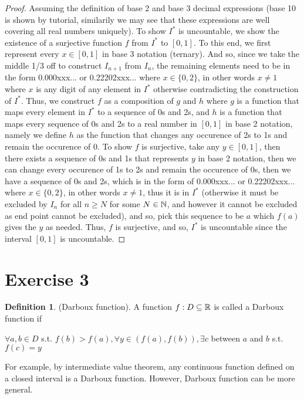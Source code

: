 \documentclass{homework}
\newcommand{\R}{\bb{R}} %
\newcommand{\N}{\bb{N}} %
\newcommand{\?}{\stackrel{?}{=}}
\theoremstyle{definition}
\newtheorem*{definition}{Definition}
\begin{document}
\begin{proof}
    Assuming the definition of base 2 and base 3 decimal expressions (base 10 is shown by tutorial, similarily we may see that these expressions are well covering all real numbers uniquely). To show $I^*$ is uncountable, we show the existence of a surjective function $f$ from $I^*$ to $[0,1]$. To this end, we first represent every $x\in[0,1]$ in base 3 notation (ternary). And so, since we take the middle 1/3 off to construct $I_{n+1}$ from $I_n$, the remaining elements need to be in the form 0.000xxx... or 0.22202xxx... where $x\in\{0,2\}$, in other words $x\neq1$ where $x$ is any digit of any element in $I^*$ otherwise contradicting the construction of $I^*$. Thus, we construct $f$ as a composition of $g$ and $h$ where $g$ is a function that maps every element in $I^*$ to a sequence of 0s and 2s, and $h$ is a function that maps every sequence of 0s and 2s to a real number in $[0,1]$ in base 2 notation, namely we define $h$ as the function that changes any occurence of 2s to 1s and remain the occurence of 0. To show $f$ is surjective, take any $y\in[0,1]$, then there exists a sequence of 0s and 1s that represents $y$ in base 2 notation, then we can change every occurence of 1s to 2s and remain the occurence of 0s, then we have a sequence of 0s and 2s, which is in the form of 0.000xxx... or 0.22202xxx... where $x\in\{0,2\}$, in other words $x\neq1$, thus it is in $I^*$ (otherwise it must be excluded by $I_n$ for all $n\geq N$ for some $N\in\N$, and however it cannot be excluded as end point cannot be excluded), and so, pick this sequence to be $a$ which $f(a)$ gives the $y$ as needed. Thus, $f$ is surjective, and so, $I^*$ is uncountable since the interval $[0,1]$ is uncountable. 
\end{proof}


\newpage
\section*{Exercise 3}
\begin{definition}
    (Darboux function). A function $f:D\subseteq\R$ is called a Darboux function if 
    
    $\forall a,b\in D$ s.t. $f(b)>f(a), \forall y\in (f(a),f(b)), \exists c$ between $a$ and $b$ s.t. $f(c)=y$
\end{definition}

For example, by intermediate value theorem, any continuous function defined on a closed interval is a Darboux function. However, Darboux function can be more general.
\end{document}
